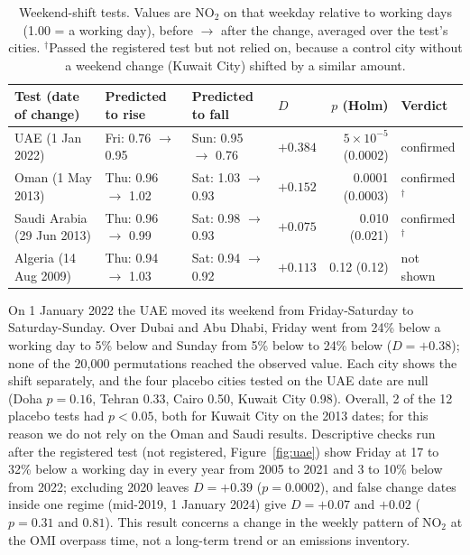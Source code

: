 \documentclass[11pt,a4paper]{article}
\begin{document}
\begin{table}[t]
  \centering\small
  \footnotesize\setlength{\tabcolsep}{4pt}
  \begin{tabular}{@{}llllrl@{}}
    \toprule
    Test (date of change) & Predicted to rise & Predicted to fall & $D$ & $p$ (Holm) & Verdict \\
    \midrule
    UAE (1 Jan 2022)          & Fri: 0.76 $\to$ 0.95 & Sun: 0.95 $\to$ 0.76 & $+0.384$ & $5\times10^{-5}$ (0.0002) & confirmed \\
    Oman (1 May 2013)         & Thu: 0.96 $\to$ 1.02 & Sat: 1.03 $\to$ 0.93 & $+0.152$ & 0.0001 (0.0003) & confirmed$^\dagger$ \\
    Saudi Arabia (29 Jun 2013)& Thu: 0.96 $\to$ 0.99 & Sat: 0.98 $\to$ 0.93 & $+0.075$ & 0.010 (0.021) & confirmed$^\dagger$ \\
    Algeria (14 Aug 2009)     & Thu: 0.94 $\to$ 1.03 & Sat: 0.94 $\to$ 0.92 & $+0.113$ & 0.12 (0.12) & not shown \\
    \bottomrule
  \end{tabular}
  \caption{Weekend-shift tests. Values are NO$_2$ on that weekday relative to working days (1.00 = a working day),
  before $\to$ after the change, averaged over the test's cities. $^\dagger$Passed the registered test but not relied
  on, because a control city without a weekend change (Kuwait City) shifted by a similar amount.}
  \label{tab:weekend}
\end{table}

On 1 January 2022 the UAE moved its weekend from Friday-Saturday to Saturday-Sunday. Over Dubai and Abu Dhabi, Friday
went from 24\% below a working day to 5\% below and Sunday from 5\% below to 24\% below ($D = +0.38$); none of the
20{,}000 permutations reached the observed value. Each city shows the shift separately, and the four placebo cities
tested on the UAE date are null (Doha $p = 0.16$, Tehran 0.33, Cairo 0.50, Kuwait City 0.98). Overall, 2 of the 12
placebo tests had $p < 0.05$, both for Kuwait City on the 2013 dates; for this reason we do not rely on the Oman and
Saudi results. Descriptive checks run after the registered test (not registered, Figure~\ref{fig:uae}) show Friday at
17 to 32\% below a working day in every year from 2005 to 2021 and 3 to 10\% below from 2022; excluding 2020 leaves
$D = +0.39$ ($p = 0.0002$), and false change dates inside one regime (mid-2019, 1 January 2024) give $D = +0.07$ and
$+0.02$ ($p = 0.31$ and $0.81$). This result concerns a change in the weekly pattern of NO$_2$ at the OMI overpass time,
not a long-term trend or an emissions inventory.
\end{document}
